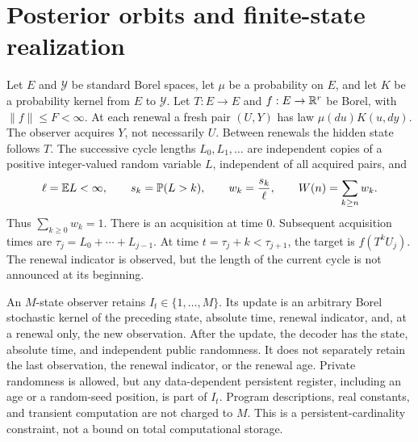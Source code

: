 \section{Posterior orbits and finite-state realization}\label{sec:v4-orbits}

Let $E$ and $\mathcal Y$ be standard Borel spaces, let $\mu$ be a
probability on $E$, and let $K$ be a probability kernel from $E$ to
$\mathcal Y$. Let $T:E\to E$ and $f:E\to\mathbb R^r$ be Borel, with
$\|f\|\le F<\infty$. At each renewal a fresh pair $(U,Y)$ has law
$\mu(du)K(u,dy)$. The observer acquires $Y$, not necessarily $U$.
Between renewals the hidden state follows $T$. The successive cycle
lengths $L_0,L_1,\ldots$ are independent copies of a positive
integer-valued random variable $L$, independent of all acquired pairs,
and
\begin{equation}
 \ell=\mathbb E L<\infty,\qquad s_k=\mathbb P(L>k),\qquad
 w_k=\frac{s_k}{\ell},\qquad W(n)=\sum_{k\ge n}w_k.                 \label{eq:v4-renewal-weights}
\end{equation}
Thus $\sum_{k\ge0}w_k=1$. There is an acquisition at time $0$.
Subsequent acquisition times are $\tau_j=L_0+\cdots+L_{j-1}$.
At time $t=\tau_j+k<\tau_{j+1}$, the target is $f(T^kU_j)$.
The renewal indicator is observed, but the length of the current cycle
is not announced at its beginning.

An $M$-state observer retains $I_t\in\{1,\ldots,M\}$. Its update is
an arbitrary Borel stochastic kernel of the preceding state, absolute
time, renewal indicator, and, at a renewal only, the new observation.
After the update, the decoder has the state, absolute time, and
independent public randomness. It does not separately retain the last
observation, the renewal indicator, or the renewal age. Private
randomness is allowed, but any data-dependent persistent register,
including an age or a random-seed position, is part of $I_t$.
Program descriptions, real constants, and transient computation are
not charged to $M$. This is a persistent-cardinality constraint,
not a bound on total computational storage.

